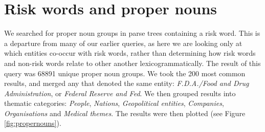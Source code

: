 \section{Risk words and proper nouns} \FloatBarrier

We searched for proper noun groups in parse trees containing a risk word. This is a departure from many of our earlier queries, as here we are looking only at which entities co-occur with risk words, rather than determining how risk words and non-risk words relate to other another lexicogrammatically. The result of this query was 68891 unique proper noun groups. We took the 200 most common results, and merged any that denoted the same entity: \emph{F.D.A.\slash Food and Drug Administration}, or \emph{Federal Reserve and Fed}. We then grouped results into thematic categories: \emph{People}, \emph{Nations}, \emph{Geopolitical entities}, \emph{Companies}, \emph{Organisations} and \emph{Medical themes}. The results were then plotted (see Figure \ref{fig:propernouns}). 

